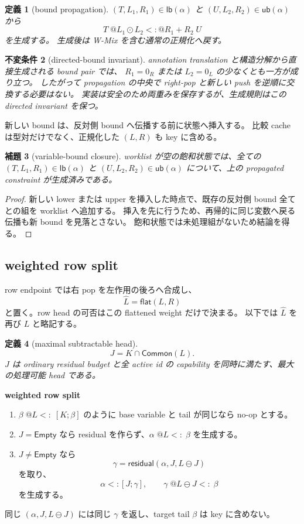 \documentclass[uplatex,dvipdfmx,a4paper,10.5pt]{jsarticle}
\makeatletter
\theoremstyle{jpplain}
\newtheorem{definition}{定義}[section]
\newtheorem{lemma}[definition]{補題}
\newtheorem{invariant}[definition]{不変条件}
\newcommand{\Empty}{\mathsf{Empty}}
\newcommand{\lb}{\mathsf{lb}}
\newcommand{\ub}{\mathsf{ub}}
\newcommand{\resid}{\mathsf{residual}}
\newcommand{\Common}{\mathsf{Common}}
\newcommand{\row}[2]{[#1;#2]}
\newcommand{\wsub}[4]{#1\;@#2\mathrel{<:}@#3\;#4}
\newcommand{\lsub}[3]{#1\;@#2\mathrel{<:}\;#3}
\newcommand{\subty}[2]{#1\mathrel{<:}#2}
\makeatother
\begin{document}
\begin{definition}[bound propagation]
$(T,L_1,R_1)\in\lb(\alpha)$ と
$(U,L_2,R_2)\in\ub(\alpha)$ から
\[
  \wsub{T}{L_1\odot L_2}{R_1+R_2}{U}
\]
を生成する。
生成後は W-Mix を含む通常の正規化へ戻す。
\end{definition}

\begin{invariant}[directed-bound invariant]
annotation translation と構造分解から直接生成される bound pair では、
$R_1=0_R$ または $L_2=0_L$ の少なくとも一方が成り立つ。
したがって propagation の中央で right-pop と新しい push を逆順に交換する必要はない。
実装は安全のため両重みを保存するが、生成規則はこの directed invariant を保つ。
\end{invariant}

新しい bound は、反対側 bound へ伝播する前に状態へ挿入する。
比較 cache は型対だけでなく、正規化した $(L,R)$ も key に含める。

\begin{lemma}[variable-bound closure]
worklist が空の飽和状態では、全ての
$(T,L_1,R_1)\in\lb(\alpha)$ と
$(U,L_2,R_2)\in\ub(\alpha)$ について、上の propagated constraint が生成済みである。
\end{lemma}

\begin{proof}
新しい lower または upper を挿入した時点で、既存の反対側 bound 全てとの組を worklist へ追加する。
挿入を先に行うため、再帰的に同じ変数へ戻る伝播も新 bound を見落とさない。
飽和状態では未処理組がないため結論を得る。
\end{proof}

\subsection{weighted row split}\label{sec:row-split}

row endpoint では右 pop を左作用の後ろへ合成し、
\[
  \widehat L=\mathsf{flat}(L,R)
\]
と置く。row head の可否はこの flattened weight だけで決まる。
以下では $\widehat L$ を再び $L$ と略記する。

\begin{definition}[maximal subtractable head]
\[
  J=K\cap\Common(L).
\]
$J$ は ordinary residual budget と全 active id の capability を同時に満たす、最大の処理可能 head である。
\end{definition}

\begin{formalbox}
\textbf{weighted row split}

\begin{enumerate}
  \item $\lsub{\beta}{L}{\row{K}{\beta}}$ のように base variable と tail が同じなら no-op とする。
  \item $J=\Empty$ なら residual を作らず、$\lsub{\alpha}{L}{\beta}$ を生成する。
  \item $J\neq\Empty$ なら
  \[
    \gamma=\resid(\alpha,J,L\ominus J)
  \]
  を取り、
  \[
    \subty{\alpha}{\row{J}{\gamma}},
    \qquad
    \lsub{\gamma}{L\ominus J}{\beta}
  \]
  を生成する。
\end{enumerate}
同じ $(\alpha,J,L\ominus J)$ には同じ $\gamma$ を返し、target tail $\beta$ は key に含めない。
\end{formalbox}
\end{document}
